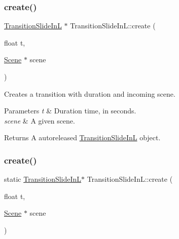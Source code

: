 \mbox{\label{classTransitionSlideInL_acb0d25510a72c361f690a1a9bcbe4bdc}} 
\subsubsection{\texorpdfstring{create()}{create()}\hspace{0.1cm}{\footnotesize\ttfamily [1/2]}}
{\footnotesize\ttfamily \hyperlink{classTransitionSlideInL}{Transition\+Slide\+InL} $\ast$ Transition\+Slide\+In\+L\+::create (\begin{DoxyParamCaption}\item[{float}]{t,  }\item[{\hyperlink{classScene}{Scene} $\ast$}]{scene }\end{DoxyParamCaption})\hspace{0.3cm}{\ttfamily [static]}}

Creates a transition with duration and incoming scene.


\begin{DoxyParams}{Parameters}
{\em t} & Duration time, in seconds. \\
\hline
{\em scene} & A given scene. \\
\hline
\end{DoxyParams}
\begin{DoxyReturn}{Returns}
A autoreleased \hyperlink{classTransitionSlideInL}{Transition\+Slide\+InL} object. 
\end{DoxyReturn}
\mbox{\label{classTransitionSlideInL_a3ff4ec4b1cebe7fd16d6b13d559d016a}} 
\subsubsection{\texorpdfstring{create()}{create()}\hspace{0.1cm}{\footnotesize\ttfamily [2/2]}}
{\footnotesize\ttfamily static \hyperlink{classTransitionSlideInL}{Transition\+Slide\+InL}$\ast$ Transition\+Slide\+In\+L\+::create (\begin{DoxyParamCaption}\item[{float}]{t,  }\item[{\hyperlink{classScene}{Scene} $\ast$}]{scene }\end{DoxyParamCaption})\hspace{0.3cm}{\ttfamily [static]}}

